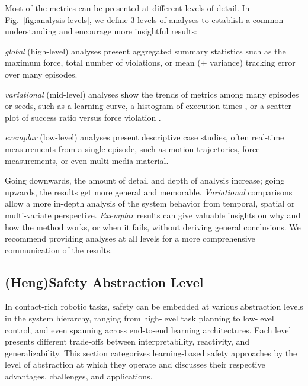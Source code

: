 \documentclass[Afour,sageh,times]{template/sagej}
\newcommand{\suggest}[1]{{\color{olive} (#1)}}
\begin{document}
Most of the metrics can be presented at different levels of detail. 
In Fig.~\ref{fig:analysis-levels},
we define 3 levels of analyses to establish a common understanding and encourage more insightful results: \begin{enumerate*}
    \item \textit{global} (high-level) analyses present aggregated summary statistics such as the maximum force, total number of violations, or mean ($\pm$ variance) tracking error over many episodes. 
    \item \textit{variational} (mid-level) analyses show the trends of metrics among many episodes or seeds, such as a learning curve, a histogram of execution times%
    , or a scatter plot of success ratio versus force violation%
    .
    \item \textit{exemplar} (low-level) analyses present descriptive case studies, often real-time measurements from a single episode, such as motion trajectories, force measurements, or even multi-media material.
\end{enumerate*}
Going downwards, the amount of detail and depth of analysis increase; going upwards, the results get more general and memorable. %
\textit{Variational} comparisons allow a more in-depth analysis of the system behavior from temporal, spatial or multi-variate perspective. 
\textit{Exemplar} results can give valuable insights on why and how the method works, or when it fails, without deriving general conclusions. 
We recommend providing analyses at all levels for a more comprehensive communication of the results. 

\subsection{\suggest{Heng}Safety Abstraction Level}
In contact-rich robotic tasks, safety can be embedded at various abstraction levels in the system hierarchy, ranging from high-level task planning to low-level control, and even spanning across end-to-end learning architectures. Each level presents different trade-offs between interpretability, reactivity, and generalizability. This section categorizes learning-based safety approaches by the level of abstraction at which they operate and discusses their respective advantages, challenges, and applications.
\end{document}
